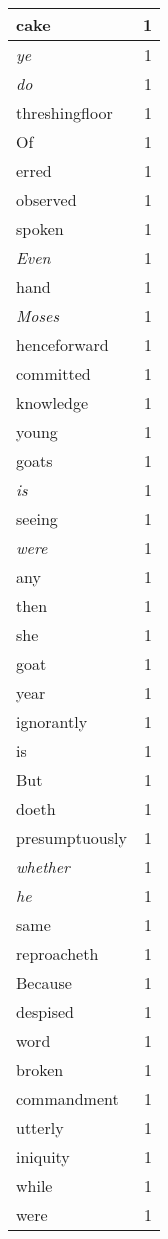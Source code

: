 \begin{center}
\begin{longtable}{l|r}
cake & 1 \\ \hline
\emph{ye} & 1 \\ \hline
\emph{do} & 1 \\ \hline
threshingfloor & 1 \\ \hline
Of & 1 \\ \hline
erred & 1 \\ \hline
observed & 1 \\ \hline
spoken & 1 \\ \hline
\emph{Even} & 1 \\ \hline
hand & 1 \\ \hline
\emph{Moses} & 1 \\ \hline
henceforward & 1 \\ \hline
committed & 1 \\ \hline
knowledge & 1 \\ \hline
young & 1 \\ \hline
goats & 1 \\ \hline
\emph{is} & 1 \\ \hline
seeing & 1 \\ \hline
\emph{were} & 1 \\ \hline
any & 1 \\ \hline
then & 1 \\ \hline
she & 1 \\ \hline
goat & 1 \\ \hline
year & 1 \\ \hline
ignorantly & 1 \\ \hline
is & 1 \\ \hline
But & 1 \\ \hline
doeth & 1 \\ \hline
presumptuously & 1 \\ \hline
\emph{whether} & 1 \\ \hline
\emph{he} & 1 \\ \hline
same & 1 \\ \hline
reproacheth & 1 \\ \hline
Because & 1 \\ \hline
despised & 1 \\ \hline
word & 1 \\ \hline
broken & 1 \\ \hline
commandment & 1 \\ \hline
utterly & 1 \\ \hline
iniquity & 1 \\ \hline
while & 1 \\ \hline
were & 1 \\ \hline

\end{longtable}
\end{center}
